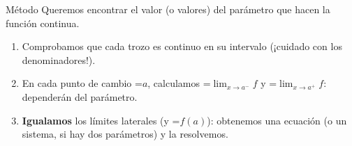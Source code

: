 \documentclass[11pt,a4paper]{article}
\newcommand{\fmm}[1]{\setbox0=\hbox{$#1$}\ifdim\wd0>\linewidth\[#1\]\else\mbox{\box0}\fi}
\begin{document}
  

  
\begin{fmdef}{Método}
Queremos encontrar el valor (o valores) del parámetro que hacen la función continua.

      
\begin{enumerate}
\item Comprobamos que cada trozo es continuo en su intervalo (¡cuidado con los denominadores!).
\item En cada punto de cambio \fmm{a}, calculamos \fmm{\lim_{x\to a^-}f} y \fmm{\lim_{x\to a^+}f}: dependerán del parámetro.
\item \textbf{Igualamos} los límites laterales (y \fmm{f(a)}): obtenemos una ecuación (o un sistema, si hay dos parámetros) y la resolvemos.
\end{enumerate}
\end{fmdef}
\end{document}

